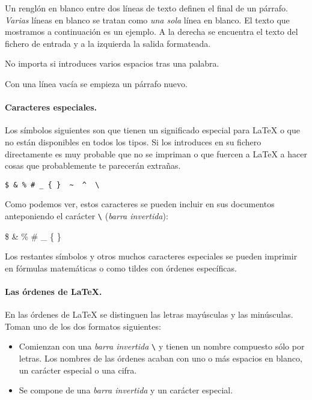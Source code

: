 Un renglón en blanco entre dos líneas  de texto definen el final de un
párrafo. \emph{Varias} líneas en blanco se tratan como \emph{una sola}
línea en blanco. El texto que  mostramos a continuación es un ejemplo.
A la  derecha se  encuentra el  texto del  fichero de  entrada y  a la
izquierda la salida formateada.

\begin{example}
No importa si introduces
varios        espacios tras
una palabra.

Con una línea vacía se
empieza un párrafo nuevo.
\end{example}
 
\paragraph{Caracteres especiales.}

Los símbolos  siguientes son   que tienen un
significado especial para \LaTeX{} o que no están disponibles en todos
los  tipos.  Si los  introduces  en  su  fichero directamente  es  muy
probable que no se impriman o que fuercen a \LaTeX{} a hacer cosas que
probablemente te parecerán extrañas.
%
\begin{code}
\verb.$ & % # _ { }  ~  ^  \ . 
\end{code}

Como podemos ver, estos caracteres se pueden incluir en sus documentos
anteponiendo   el  carácter   \verb|\|  (\emph{barra   invertida}):  %
\begin{example} \$ \& \% \# \_ \{ \} \end{example}

Los  restantes  símbolos  y  otros  muchos  caracteres  especiales  se
pueden  imprimir en  fórmulas matemáticas  o como  tildes con  órdenes
específicas.

\paragraph{Las órdenes de \LaTeX{}.}

En las órdenes de \LaTeX{} se distinguen
las letras mayúsculas y las minúsculas.  Toman uno de los dos formatos
siguientes:

\begin{itemize}

\item  Comienzan  con  una  \emph{barra  invertida}  \verb|\|\cih{\bs} y  tienen un  nombre compuesto  sólo por
letras. Los  nombres de las órdenes  acaban con uno o  más espacios en
blanco, un carácter especial o una cifra.

\item Se compone de una \emph{barra invertida} y un carácter especial.

\end{itemize}

